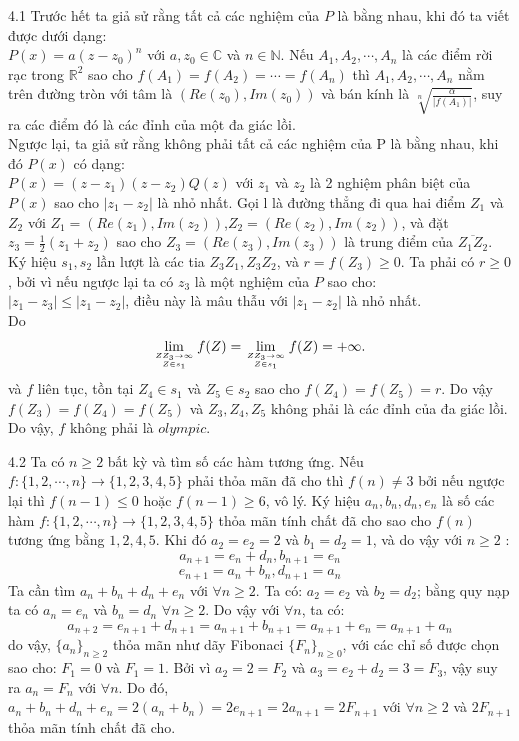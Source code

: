 \begin{Answer}{4.1}
Trước hết ta giả sử rằng tất cả các nghiệm của $P$ là bằng nhau, khi đó ta viết được dưới dạng:\\
$P(x)=a(z-z_0)^n$ với $a, z_0 \in \mathbb{C}$ và $n\in \mathbb{N}$. Nếu $ A_1,A_2,\cdots, A_n$ là các điểm rời rạc trong $\mathbb{R}^2$ sao cho $f(A_1)=f(A_2)=\cdots=f(A_n)$ thì $A_1, A_2, \cdots, A_n$ nằm trên đường tròn với tâm là $(Re(z_0), Im(z_0))$ và bán kính là $\sqrt[n]{\frac{\alpha}{\left|f(A_1)\right|}}$, suy ra các điểm đó là các đỉnh của một đa giác lồi. \\
Ngược lại, ta giả sử rằng không phải tất cả các nghiệm của P là bằng nhau, khi đó $P(x)$ có dạng:\\
$P(x)=(z-z_1)(z-z_2)Q(z)$ với $z_1$ và $z_2$ là 2 nghiệm phân biệt của $P(x)$ sao cho $\left|z_1-z_2\right|$ là nhỏ nhất. Gọi l là đường thẳng đi qua hai điểm $Z_1$ và $Z_2$ với $Z_1=(Re(z_1),Im(z_2))$,$Z_2=(Re(z_2),Im(z_2))$, và đặt $z_3=\frac{1}{2}(z_1+z_2)$ sao cho $Z_3=(Re(z_3),Im(z_3))$ là trung điểm của $\overline{Z_1Z_2}$. Ký hiệu $ s_1, s_2$ lần lượt là các tia $ Z_3Z_1,Z_3Z_2$, và $r=f(Z_3) \geq 0$. Ta phải có $r\ge 0$, bởi vì nếu ngược lại ta có $z_3$ là một nghiệm của $P$ sao cho:\\
$\left|z_1-z_3\right|\le \left|z_1-z_2\right|$, điều này là mâu thẫu với $\left|z_1-z_2\right|$ là nhỏ nhất. \\
Do $$ \lim_{ZZ_3\to\infty\atop Z\in s_1}f(Z) =\lim_{ZZ_3\to\infty\atop Z\in s_1}f(Z)=+\infty. $$
và $f$ liên tục, tồn tại $Z_4 \in s_1$ và $Z_5 \in s_2$ sao cho $ f(Z_4)=f(Z_5)=r$. Do vậy $ f(Z_3)=f(Z_4)=f(Z_5)$ và $Z_3, Z_4, Z_5$ không phải là các đỉnh của đa giác lồi. Do vậy, $f$ không phải là $olympic$.
\end{Answer}
\begin{Answer}{4.2}
Ta có $n\geq 2$ bất kỳ và tìm số các hàm tương ứng. Nếu $f:\{1,2,\cdots,n\}\rightarrow \{1,2,3,4,5\}$ phải thỏa mãn đã cho thì $f(n) \ne 3$ bởi nếu ngược lại thì $f(n-1)\leq 0$ hoặc $f(n-1) \geq 6$, vô lý. Ký hiệu $a_n,b_n,d_n,e_n$ là số các hàm $f:\{1,2,\cdots,n\}\rightarrow \{1,2,3,4,5\}$ thỏa mãn tính chất đã cho sao cho $f(n)$ tương ứng bằng $1,2,4,5$. Khi đó $a_2=e_2=2$ và $b_1=d_2=1$, và do vậy với $n\geq 2$ :\\
$$a_{n+1}=e_n+d_n, b_{n+1}=e_n$$
$$e_{n+1}=a_n+b_n, d_{n+1}=a_n$$
 Ta cần tìm $a_n+b_n+d_n+e_n$ với $\forall n\geq 2$. Ta có: $a_2=e_2$ và $b_2=d_2$; bằng quy nạp ta có $a_n=e_n$ và $b_n=d_n$ $\forall n\geq 2$. Do vậy với $\forall n$, ta có:\\
$$a_{n+2}=e_{n+1}+d_{n+1}=a_{n+1}+b_{n+1}=a_{n+1}+e_{n}=a_{n+1}+a_n$$
do vậy, $\{a_n\}_{n\geq2}$ thỏa mãn như dãy Fibonaci $\{F_n\}_{n\geq0}$, với các chỉ số được chọn sao cho: $F_1=0$ và $F_1=1$. Bởi vì $ a_2=2=F_2$ và $a_3=e_2+d_2=3=F_3$, vậy suy ra $ a_n=F_n$ với $\forall n$. Do đó,$a_n+b_n+d_n+e_n=2(a_n+b_n)=2e_{n+1}=2a_{n+1}=2F_{n+1}$ với $\forall n\geq 2$ và $2F_{n+1}$ thỏa mãn tính chất đã cho.
\end{Answer}
